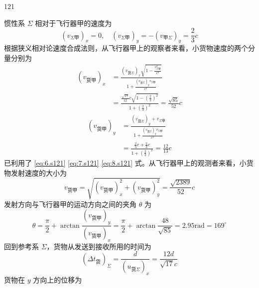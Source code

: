 \begin{solution}{121}
\begin{subsolution}
        惯性系 $\Sigma$ 相对于飞行器甲的速度为
        \begin{equation}
            (v_{\Sigma \text{甲}})_{x} = 0, \quad (v_{\Sigma \text{甲}})_{y} = -(v_{\text{甲}\Sigma})_{y} = \frac{2}{3} c
            \label{eq:8.s121}
        \end{equation}
        根据狭义相对论速度合成法则，从飞行器甲上的观察者来看，小货物速度的两个分量分别为
        \begin{align}
            (v_{\text{货甲}})_{x} & = \frac{(v_{\text{货}\Sigma})_{x} \sqrt{1 - \frac{v_{\Sigma \text{甲}}^{2}}{c^{2}}}}{1 + \frac{(v_{\text{货}\Sigma})_{y} v_{\Sigma \text{甲}}}{c^{2}}} \nonumber \\
            & = \frac{\frac{\sqrt{17}}{12} c \sqrt{1 - (\frac{2}{3})^{2}}}{1 + (\frac{2}{3})^{2}} = \frac{\sqrt{85}}{52} c
            \label{eq:9.s121}
        \end{align}
        \begin{align}
            (v_{\text{货甲}})_{y} & = \frac{(v_{\text{货}\Sigma})_{y} + v_{\Sigma \text{甲}}}{1 + \frac{(v_{\text{货}\Sigma})_{y} v_{\Sigma \text{甲}}}{c^{2}}} \nonumber \\
            & = \frac{\frac{2}{3} c + \frac{2}{3} c}{1 + (\frac{2}{3})^{2}} = \frac{12}{13} c
            \label{eq:10.s121}
        \end{align}
        已利用了 \eqref{eq:6.s121} \eqref{eq:7.s121} \eqref{eq:8.s121} 式。从飞行器甲上的观测者来看，小货物发射速度的大小为
        \begin{equation}
            v_{\text{货甲}} = \sqrt{(v_{\text{货甲}})_{x}^{2} + (v_{\text{货甲}})_{y}^{2}} = \frac{\sqrt{2389}}{52} c
            \label{eq:11.s121}
        \end{equation}
        发射方向与飞行器甲的运动方向之间的夹角 $\theta$ 为
        \begin{equation}
            \theta = \frac{\pi}{2} + \arctan \frac{(v_{\text{货甲}})_{y}}{(v_{\text{货甲}})_{x}} = \frac{\pi}{2} + \arctan \frac{48}{\sqrt{85}} = 2.95 \mathrm{rad} = 169^{\circ}
            \label{eq:12.s121}
        \end{equation}
        回到参考系 $\Sigma$，货物从发送到接收所用的时间为
        \begin{equation}
            (\Delta t_{\text{货}})_{\Sigma} = \frac{d}{(u_{\text{货}\Sigma})_{x}} = \frac{12 d}{\sqrt{17} c}
            \label{eq:13.s121}
        \end{equation}
        货物在 $y$ 方向上的位移为
        \begin{equation}

\end{equation}
\end{subsolution}
\end{solution}
